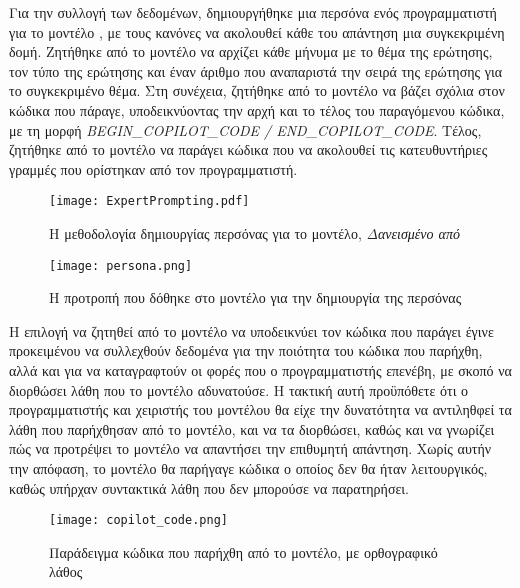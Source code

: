 Για την συλλογή των δεδομένων, δημιουργήθηκε μια περσόνα ενός
προγραμματιστή για το μοντέλο \cite{zhou2024sotopia,AitBaha2023,
  xu2023expertprompting}, με τους κανόνες να ακολουθεί κάθε του απάντηση
μια συγκεκριμένη δομή. Ζητήθηκε από το μοντέλο να αρχίζει κάθε μήνυμα με
το θέμα της ερώτησης, τον τύπο της ερώτησης και έναν άριθμο που
αναπαριστά την σειρά της ερώτησης για το συγκεκριμένο θέμα. Στη
συνέχεια, ζητήθηκε από το μοντέλο να βάζει σχόλια στον κώδικα που
πάραγε, υποδεικνύοντας την αρχή και το τέλος του παραγόμενου κώδικα, με
τη μορφή \textlatin{\textit{BEGIN\_COPILOT\_CODE / END\_COPILOT\_CODE}}.
Τέλος, ζητήθηκε από το μοντέλο να παράγει κώδικα που να ακολουθεί τις
κατευθυντήριες γραμμές που ορίστηκαν από τον προγραμματιστή.

\begin{figure}[H]
  \begin{center}
    \texttt{[image: ExpertPrompting.pdf]}
    \caption{Η μεθοδολογία δημιουργίας περσόνας για το μοντέλο,
      \textit{Δανεισμένο από \cite{xu2023expertprompting}} }
  \end{center}
  \label{fig:ExpertPrompting}
\end{figure}

\begin{figure}[H]
  \begin{center}
    \texttt{[image: persona.png]}
    \caption{Η προτροπή που δόθηκε στο μοντέλο για την δημιουργία της
      περσόνας}
  \end{center}
  \label{fig:persona}
\end{figure}

Η επιλογή να ζητηθεί από το μοντέλο να υποδεικνύει τον κώδικα που
παράγει έγινε προκειμένου να συλλεχθούν δεδομένα για την ποιότητα του
κώδικα που παρήχθη, αλλά και για να καταγραφτούν οι φορές που ο
προγραμματιστής επενέβη, με σκοπό να διορθώσει λάθη που το μοντέλο
αδυνατούσε. Η τακτική αυτή προϋπόθετε ότι ο προγραμματιστής και
χειριστής του μοντέλου θα είχε την δυνατότητα να αντιληθφεί τα λάθη που
παρήχθησαν από το μοντέλο, και να τα διορθώσει, καθώς και να γνωρίζει
πώς να προτρέψει το μοντέλο να απαντήσει την επιθυμητή απάντηση. Χωρίς
αυτήν την απόφαση, το μοντέλο θα παρήγαγε κώδικα ο οποίος δεν θα ήταν
λειτουργικός, καθώς υπήρχαν συντακτικά λάθη που δεν μπορούσε να
παρατηρήσει.

\begin{figure}[H]
  \begin{center}
    \texttt{[image: copilot\_code.png]}
    \caption{Παράδειγμα κώδικα που παρήχθη από το μοντέλο, με
      ορθογραφικό λάθος}
  \end{center}
  \label{fig:copilotCode}
\end{figure}

